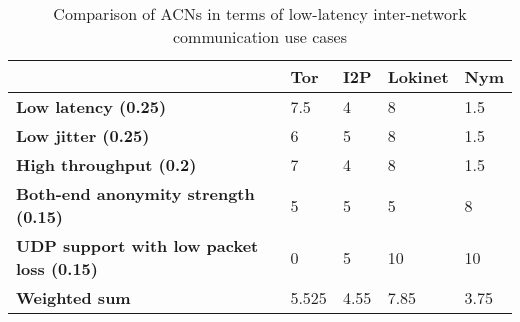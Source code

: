 \begin{table}[!ht]
\caption{Comparison of ACNs in terms of low-latency inter-network communication use cases}
\label{tab:low_latency_uc}
\small
\begin{tabular}{|p{}|p{}|p{}|p{}|p{}|}
\hline
\textbf{} & \textbf{Tor} & \textbf{I2P} & \textbf{Lokinet} & \textbf{Nym} \\
\hline
\textbf{Low latency (0.25)} & 7.5 & 4 & 8 & 1.5 \\
\hline
\textbf{Low jitter (0.25)} & 6 & 5 & 8 & 1.5 \\
\hline
\textbf{High throughput (0.2)} & 7 & 4 & 8 & 1.5 \\
\hline
\textbf{Both-end anonymity strength (0.15)} & 5 & 5 & 5 & 8 \\
\hline
\textbf{UDP support with low packet loss (0.15)} & 0 & 5 & 10 & 10 \\
\hline
\textbf{Weighted sum} & 5.525 & 4.55 & 7.85 & 3.75 \\
\hline
\end{tabular}
\end{table}


